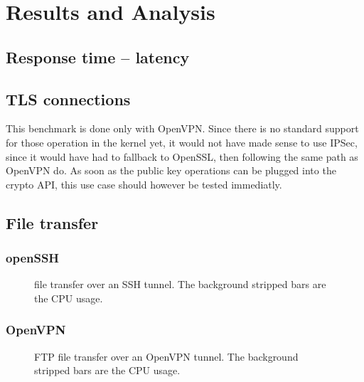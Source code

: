 \chapter{Results and Analysis}\label{chap:results}

\section{Response time -- latency}

\section{TLS connections}

This benchmark is done only with OpenVPN.
Since there is no standard support for those operation in the kernel yet, it would not have made sense to use IPSec, since it would have had to fallback to OpenSSL, then following the same path as OpenVPN do.
As soon as the public key operations can be plugged into the crypto API, this use case should however be tested immediatly.

\section{File transfer}


\subsection{openSSH}

\begin{figure}[ht]

\caption{file transfer over an SSH tunnel. The background stripped bars are the CPU usage.}
\label{fig:openssh-bench}
\end{figure}

\subsection{OpenVPN}

\begin{figure}[ht]

\caption{FTP file transfer over an OpenVPN tunnel. The background stripped bars are the CPU usage.}
\label{fig:openvpn-ftp-bench}
\end{figure}

